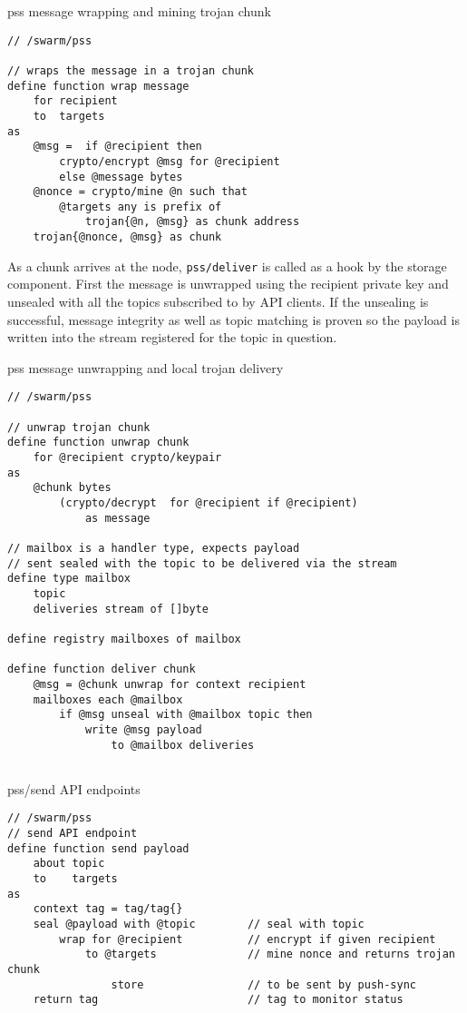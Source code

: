 \begin{definition}{pss message wrapping and mining trojan chunk}\label{def:wrap}
\begin{lstlisting}[language=buzz1]
// /swarm/pss

// wraps the message in a trojan chunk
define function wrap message 
    for recipient
    to  targets
as 
    @msg =  if @recipient then
        crypto/encrypt @msg for @recipient 
        else @message bytes
    @nonce = crypto/mine @n such that
        @targets any is prefix of
            trojan{@n, @msg} as chunk address 
    trojan{@nonce, @msg} as chunk 

\end{lstlisting}
\end{definition}

As a chunk arrives at the node,  \lstinline{pss/deliver} is called as a hook by the storage component.
First the message is unwrapped using the recipient private key and unsealed with all the topics subscribed to by API clients. If the unsealing is successful, message integrity as well as topic matching is proven so the payload is written into the stream registered for the topic in question.

\begin{definition}{pss message unwrapping and local trojan delivery}\label{def:unwrap}
\begin{lstlisting}[language=buzz1]
// /swarm/pss

// unwrap trojan chunk 
define function unwrap chunk
    for @recipient crypto/keypair 
as
    @chunk bytes 
        (crypto/decrypt  for @recipient if @recipient)
            as message

// mailbox is a handler type, expects payload
// sent sealed with the topic to be delivered via the stream 
define type mailbox
    topic
    deliveries stream of []byte 
    
define registry mailboxes of mailbox

define function deliver chunk
    @msg = @chunk unwrap for context recipient
    mailboxes each @mailbox 
        if @msg unseal with @mailbox topic then
            write @msg payload 
                to @mailbox deliveries 
    

\end{lstlisting}
\end{definition}


\begin{definition}{pss/send API endpoints}\label{def:send}
\begin{lstlisting}[language=buzz1]
// /swarm/pss
// send API endpoint
define function send payload
    about topic
    to    targets
as 
    context tag = tag/tag{}
    seal @payload with @topic        // seal with topic
        wrap for @recipient          // encrypt if given recipient
            to @targets              // mine nonce and returns trojan chunk
                store                // to be sent by push-sync
    return tag                       // tag to monitor status 
    
\end{lstlisting}
\end{definition}

